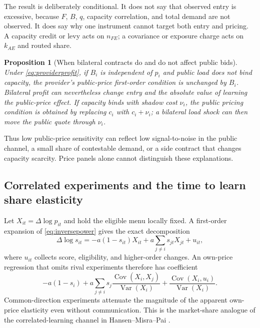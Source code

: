 \documentclass[sigconf,nonacm]{acmart}
\newtheorem{proposition}{Proposition}
\newcommand{\1}{\mathbf 1}
\begin{document}
The result is deliberately conditional.  It does not say that observed entry
is excessive, because $F$, $B$, $q$, capacity correlation, and total demand are
not observed.  It does say why one instrument cannot target both entry and
pricing.  A capacity credit or levy acts on $n_{FE}$; a covariance or exposure
charge acts on $k_{AE}$ and routed share.

\begin{proposition}[When bilateral contracts do and do not affect public bids]
\label{prop:bilateral}
Under \eqref{eq:providerprofit}, if $B_i$ is independent of $p_i$ and public
load does not bind capacity, the provider's public-price first-order condition
is unchanged by $B_i$.  Bilateral profit can nevertheless change entry and the
absolute value of learning the public-price effect.  If capacity binds with
shadow cost $\nu_i$, the public pricing condition is obtained by replacing
$c_i$ with $c_i+\nu_i$; a bilateral load shock can then move the public quote
through $\nu_i$.
\end{proposition}

Thus low public-price sensitivity can reflect low signal-to-noise in the public
channel, a small share of contestable demand, or a side contract that changes
capacity scarcity.  Price panels alone cannot distinguish these explanations.

\subsection{Correlated experiments and the time to learn share elasticity}
\label{sec:learning}

Let $X_{it}=\Delta\log p_{it}$ and hold the eligible menu locally fixed.  A
first-order expansion of \eqref{eq:inversepower} gives the exact decomposition
\begin{equation}
 \Delta\log s_{it}=-a(1-s_{it})X_{it}
 +a\sum_{j\ne i}s_{jt}X_{jt}+u_{it},
 \label{eq:rivaldecomposition}
\end{equation}
where $u_{it}$ collects score, eligibility, and higher-order changes.  An
own-price regression that omits rival experiments therefore has coefficient
\begin{equation}
 -a(1-s_i)+a\sum_{j\ne i}s_j
 \frac{\operatorname{Cov}(X_i,X_j)}{\operatorname{Var}(X_i)}
 +\frac{\operatorname{Cov}(X_i,u_i)}{\operatorname{Var}(X_i)}.
 \label{eq:ovb}
\end{equation}
Common-direction experiments attenuate the magnitude of the apparent own-price
elasticity even without communication.  This is the market-share analogue of
the correlated-learning channel in Hansen--Misra--Pai
\cite{hansenmisrapai2021}.
\end{document}
